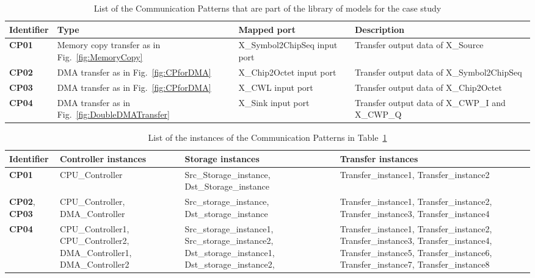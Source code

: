 \documentclass{llncs}
\begin{document}
\begin{table}[!htbp]
\centering
\caption{List of the Communication Patterns that are part of the library of models for the case study}
\label{tab:CPList2}
\begin{tabular}{| >{\centering\arraybackslash}p{2cm} | >{\centering\arraybackslash}p{3cm} | >{\centering\arraybackslash}p{4cm} |
>{\centering\arraybackslash}p{4cm} |}
	\hline
		\textbf{Identifier}	& \textbf{Type} & \textbf{Mapped port} & \textbf{Description} \\ \hline
		\textbf{CP01}	&	Memory copy transfer as in Fig.~\ref{fig:MemoryCopy} & X\_Symbol2ChipSeq input port & Transfer output data of X\_Source \\ \hline
		\textbf{CP02}	&	DMA transfer as in Fig.~\ref{fig:CPforDMA} & X\_Chip2Octet input port & Transfer output data of X\_Symbol2ChipSeq \\ \hline
		\textbf{CP03}	&	DMA transfer as in Fig.~\ref{fig:CPforDMA} & X\_CWL input port & Transfer output data of X\_Chip2Octet \\ \hline
		\textbf{CP04}	&	DMA transfer as in Fig.~\ref{fig:DoubleDMATransfer} & X\_Sink input port & Transfer output data of X\_CWP\_I and X\_CWP\_Q \\ \hline
\end{tabular}
\end{table}
%
\begin{table}[!htbp]
\centering
\caption{List of the instances of the Communication Patterns in Table~\ref{tab:CPList2}}
\label{tab:CPList3}
\begin{tabular}{| >{\centering\arraybackslash}p{2cm} | >{\centering\arraybackslash}p{3cm} | >{\centering\arraybackslash}p{4cm} |
>{\centering\arraybackslash}p{4cm} |}
	\hline
		\textbf{Identifier}	& \textbf{Controller instances} & \textbf{Storage instances} & \textbf{Transfer instances} \\ \hline
		\textbf{CP01}	&	CPU\_Controller & Src\_Storage\_instance, Dst\_Storage\_instance & Transfer\_instance1, Transfer\_instance2 \\ \hline
		\textbf{CP02}, \textbf{CP03}	&	CPU\_Controller, DMA\_Controller & Src\_storage\_instance, Dst\_storage\_instance
		& Transfer\_instance1, Transfer\_instance2, Transfer\_instance3, Transfer\_instance4 \\ \hline
		\textbf{CP04} &	CPU\_Controller1, CPU\_Controller2, DMA\_Controller1, DMA\_Controller2 & Src\_storage\_instance1,
		Src\_storage\_instance2, Dst\_storage\_instance1, Dst\_storage\_instance2, & Transfer\_instance1, Transfer\_instance2,
		Transfer\_instance3, Transfer\_instance4, Transfer\_instance5, Transfer\_instance6, Transfer\_instance7, Transfer\_instance8 \\ \hline
\end{tabular}
\end{table}
\end{document}
